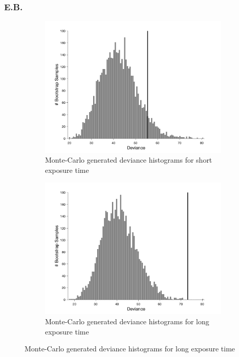 \documentclass{article}
\begin{document}
\subsubsection*{E.B.}
\begin{figure}[!hb]
    \begin{subfigure}{0.494\textwidth}
        \centering
        \includegraphics[width = \linewidth]{Thesis/plots/gof/segDist/segDist_eb_short_bootstrap.png}
        \caption{Monte-Carlo generated deviance histograms for short exposure time}
        \label{fig:da_gof_short_bootstrap}
    \end{subfigure}
    \hspace{0.01\textwidth}
    \begin{subfigure}{0.494\textwidth}
        \centering
        \includegraphics[width = \linewidth]{Thesis/plots/gof/segDist/segDist_eb_long_bootstrap.png}
        \caption{Monte-Carlo generated deviance histograms for long exposure time}
        \label{fig:da_gof_long_bootstrap}
    \end{subfigure}
    

\end{figure}
\end{document}

